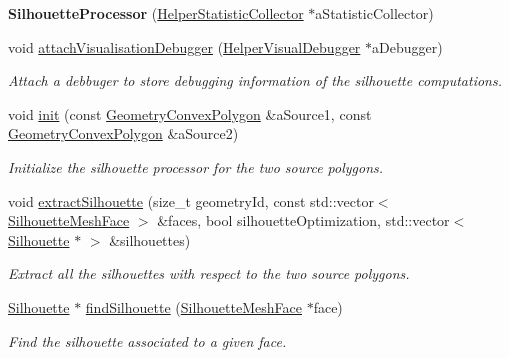 \begin{DoxyCompactItemize}
\item 
\mbox{\label{classvisilib_1_1_silhouette_processor_a860d9b677347b969cb305265e94c7bf8}} 
{\bfseries Silhouette\+Processor} (\mbox{\hyperlink{classvisilib_1_1_helper_statistic_collector}{Helper\+Statistic\+Collector}} $\ast$a\+Statistic\+Collector)
\item 
\mbox{\label{classvisilib_1_1_silhouette_processor_aac871de2acba542af88585a6ae66fe0d}} 
void \mbox{\hyperlink{classvisilib_1_1_silhouette_processor_aac871de2acba542af88585a6ae66fe0d}{attach\+Visualisation\+Debugger}} (\mbox{\hyperlink{classvisilib_1_1_helper_visual_debugger}{Helper\+Visual\+Debugger}} $\ast$a\+Debugger)
\begin{DoxyCompactList}\small\item\em Attach a debbuger to store debugging information of the silhouette computations. \end{DoxyCompactList}\item 
\mbox{\label{classvisilib_1_1_silhouette_processor_a8225d6744e57ae62d2f649e50fd4b0a2}} 
void \mbox{\hyperlink{classvisilib_1_1_silhouette_processor_a8225d6744e57ae62d2f649e50fd4b0a2}{init}} (const \mbox{\hyperlink{classvisilib_1_1_geometry_convex_polygon}{Geometry\+Convex\+Polygon}} \&a\+Source1, const \mbox{\hyperlink{classvisilib_1_1_geometry_convex_polygon}{Geometry\+Convex\+Polygon}} \&a\+Source2)
\begin{DoxyCompactList}\small\item\em Initialize the silhouette processor for the two source polygons. \end{DoxyCompactList}\item 
void \mbox{\hyperlink{classvisilib_1_1_silhouette_processor_adf8cb49855ad70e3994ff65bc4740fb2}{extract\+Silhouette}} (size\+\_\+t geometry\+Id, const std\+::vector$<$ \mbox{\hyperlink{classvisilib_1_1_silhouette_mesh_face}{Silhouette\+Mesh\+Face}} $>$ \&faces, bool silhouette\+Optimization, std\+::vector$<$ \mbox{\hyperlink{classvisilib_1_1_silhouette}{Silhouette}} $\ast$ $>$ \&silhouettes)
\begin{DoxyCompactList}\small\item\em Extract all the silhouettes with respect to the two source polygons. \end{DoxyCompactList}\item 
\mbox{\hyperlink{classvisilib_1_1_silhouette}{Silhouette}} $\ast$ \mbox{\hyperlink{classvisilib_1_1_silhouette_processor_a8b2f9edf695dd88b637e4a8b663214a0}{find\+Silhouette}} (\mbox{\hyperlink{classvisilib_1_1_silhouette_mesh_face}{Silhouette\+Mesh\+Face}} $\ast$face)
\begin{DoxyCompactList}\small\item\em Find the silhouette associated to a given face. \end{DoxyCompactList}\end{DoxyCompactItemize}
